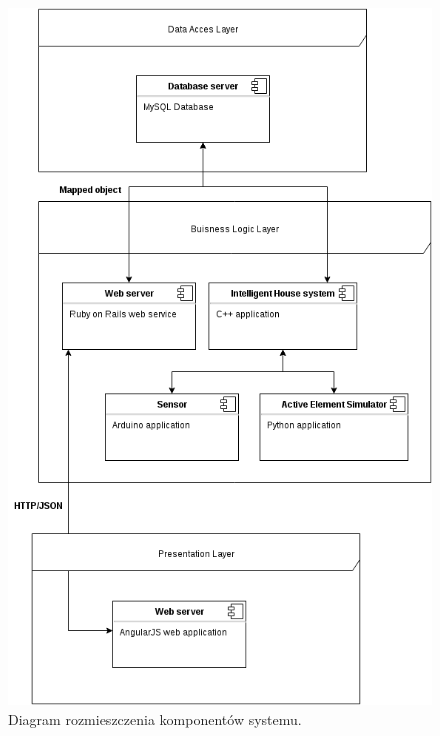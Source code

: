 \documentclass[eng,oneside]{mgr}
\begin{document}
\begin{figure}[h]
\centering
\includegraphics[width=\linewidth]{layers}
\caption{Diagram rozmieszczenia komponentów systemu.}
\label{fig:diagram_rozmieszczenia}
\end{figure}
\clearpage
\end{document}
